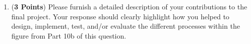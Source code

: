 \documentclass[12pt,epsf,psfig,graphics]{article}
\begin{document}
\begin{enumerate}
\begin{enumerate}
    \item ({\bf 3 Points}) Please furnish a detailed description of
      your contributions to the final project.  Your response should
      clearly highlight how you helped to design, implement, test,
      and/or evaluate the different processes within the figure from
      Part 10b of this question.
      

  \end{enumerate}

\end{enumerate}
\end{document}
